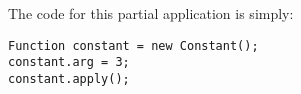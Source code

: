 \noindent The code for this partial application is simply:

\begin{lstlisting}
Function constant = new Constant();
constant.arg = 3;
constant.apply();
\end{lstlisting}

\begin{comment}
\noindent If we use the alternative encoding, it is even simpler, since
we do not need to invoke the \lstinline{apply} method:

\begin{lstlisting}
Function constant2 = new Constant2();
constant2.arg = 3;
\end{lstlisting}
\end{comment}

\begin{comment}
We begin by illustrating how it is possible to encode functional
definitions using IFOs without any optimizations. This is helpful to
introduce the key ideas of IFOs. In Figure~\ref{fig:even}, there are
two versions of an encoding of \lstinline{even} and \lstinline{odd}
using IFOs. The encoding on the left is naive and it disallows
tail-call elimination. Each function is encoded as an IFO function
object. The bodies of \lstinline{apply} show how the definitions 
of the functions are encoded. The argument \lstinline{n} of 
the functions is recovered from the field \lstinline{arg} in the 
function object. The last statement in each path of the programs 
sets the \lstinline{res} field.  
\end{comment}

\begin{comment}
While direct encodings of functions using IFOs do not by
themselfves immediatly solve the two problems, it is possible to create
simple optimizations

We illustrate how both of these goals are achieved using the 
the functions 
\end{comment}

